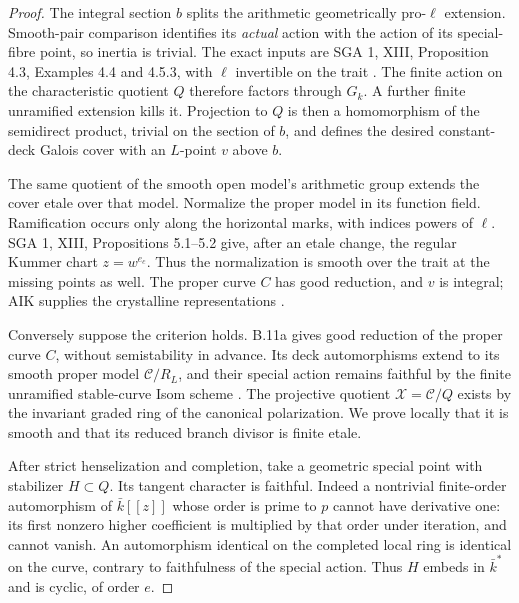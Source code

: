 \begin{proof}
The integral section $b$ splits the arithmetic geometrically pro-$\ell$
extension. Smooth-pair comparison identifies its \emph{actual} action
with the action of its special-fibre point, so inertia is trivial.
The exact inputs are SGA 1, XIII, Proposition 4.3, Examples 4.4 and
4.5.3, with $\ell$ invertible on the trait \citep{BC_SGA1}.
The finite action on the characteristic quotient $Q$ therefore factors
through $G_k$. A further finite unramified extension kills it. Projection
to $Q$ is then a homomorphism of the semidirect product, trivial on
the section of $b$, and defines the desired constant-deck Galois cover
with an $L$-point $v$ above $b$.

The same quotient of the smooth open model's arithmetic group extends
the cover etale over that model. Normalize the proper model in its
function field. Ramification occurs only along the horizontal marks,
with indices powers of $\ell$. SGA 1, XIII, Propositions 5.1--5.2
give, after an etale change, the regular Kummer chart $z=w^{e_c}$.
Thus the normalization is smooth over the trait at the missing points
as well. The proper curve $C$ has good reduction, and $v$ is integral;
AIK supplies the crystalline representations
\citep[Theorems 1.6 and 1.9]{BC_AIK}.

Conversely suppose the criterion holds. B.11a gives good reduction
of the proper curve $C$, without semistability in advance. Its deck
automorphisms extend to its smooth proper model $\mathcal C/R_L$,
and their special action remains faithful by the finite unramified
stable-curve Isom scheme \citep[Theorem 1.11]{BC_DM}.
The projective quotient $\mathcal X=\mathcal C/Q$ exists by the
invariant graded ring of the canonical polarization. We prove locally
that it is smooth and that its reduced branch divisor is finite etale.

After strict henselization and completion, take a geometric special
point with stabilizer $H\subset Q$. Its tangent character is faithful.
Indeed a nontrivial finite-order automorphism of $\bar k[[z]]$ whose
order is prime to $p$ cannot have derivative one: its first nonzero
higher coefficient is multiplied by that order under iteration, and
cannot vanish. An automorphism identical on the completed local ring
is identical on the curve, contrary to faithfulness of the special
action. Thus $H$ embeds in $\bar k^*$ and is cyclic, of order $e$.


\end{proof}
